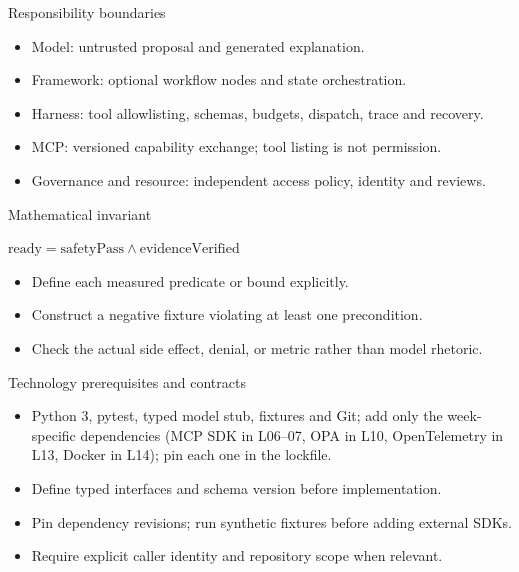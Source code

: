 \documentclass[aspectratio=169,10pt]{beamer}
\begin{document}
\begin{frame}{Responsibility boundaries}
\small
\begin{itemize}
\item Model: untrusted proposal and generated explanation.
\item Framework: optional workflow nodes and state orchestration.
\item Harness: tool allowlisting, schemas, budgets, dispatch, trace and recovery.
\item MCP: versioned capability exchange; tool listing is not permission.
\item Governance and resource: independent access policy, identity and reviews.
\end{itemize}

\end{frame}

\begin{frame}{Mathematical invariant}
\small
\begin{center}\Large $\mathrm{ready}=\mathrm{safetyPass}\land\mathrm{evidenceVerified}$\end{center}
\begin{itemize}
\item Define each measured predicate or bound explicitly.
\item Construct a negative fixture violating at least one precondition.
\item Check the actual side effect, denial, or metric rather than model rhetoric.
\end{itemize}

\end{frame}

\begin{frame}{Technology prerequisites and contracts}
\small
\begin{itemize}
\item Python 3, pytest, typed model stub, fixtures and Git; add only the week-specific dependencies (MCP SDK in L06--07, OPA in L10, OpenTelemetry in L13, Docker in L14); pin each one in the lockfile.
\item Define typed interfaces and schema version before implementation.
\item Pin dependency revisions; run synthetic fixtures before adding external SDKs.
\item Require explicit caller identity and repository scope when relevant.
\end{itemize}

\end{frame}
\end{document}
